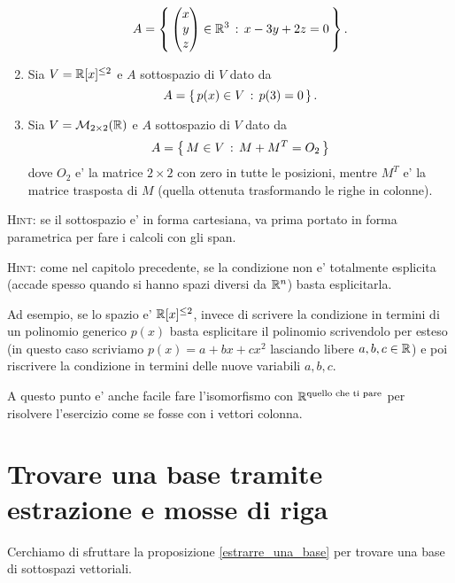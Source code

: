\begin{exercise}
\begin{enumerate}
\[            A = \left\{\,\begin{pmatrix}
                x \\ y \\ z
            \end{pmatrix} \in \mathbb{R}^3 \,:\, x - 3y + 2z = 0\,\right\}.
        \]
        \item Sia $V = \mathbb{R}[x]^{\leq 2}$ e $A$ sottospazio di $V$ dato da \[
            A = \left\{\,p(x) \in V \,:\, p(3) = 0\,\right\}.
        \]
        \item Sia $V = \mathcal{M}_{2 \times 2}(\mathbb{R})$ e $A$ sottospazio di $V$ dato da \[
            A = \left\{\,M \in V \,:\, M + M^T = O_2\,\right\}
        \] dove $O_2$ e' la matrice $2 \times 2$ con zero in tutte le posizioni, mentre $M^T$ e' la matrice trasposta di $M$ (quella ottenuta trasformando le righe in colonne).
    \end{enumerate}
\end{exercise}


\textsc{Hint:} se il sottospazio e' in forma cartesiana, va prima portato in forma parametrica per fare i calcoli con gli span.

\textsc{Hint:} come nel capitolo precedente, se la condizione non e' totalmente esplicita (accade spesso quando si hanno spazi diversi da $\mathbb{R}^n$) basta esplicitarla. 

Ad esempio, se lo spazio e' $\mathbb{R}[x]^{\leq 2}$, invece di scrivere la condizione in termini di un polinomio generico $p(x)$ basta esplicitare il polinomio scrivendolo per esteso (in questo caso scriviamo $p(x) = a + bx + cx^2$ lasciando libere $a, b, c \in \mathbb{R}$) e poi riscrivere la condizione in termini delle nuove variabili $a, b, c$. 

A questo punto e' anche facile fare l'isomorfismo con $\mathbb{R}^{\text{quello che ti pare}}$ per risolvere l'esercizio come se fosse con i vettori colonna.

\section{Trovare una base tramite estrazione e mosse di riga}

Cerchiamo di sfruttare la proposizione \ref{estrarre_una_base} per trovare una base di sottospazi vettoriali.

